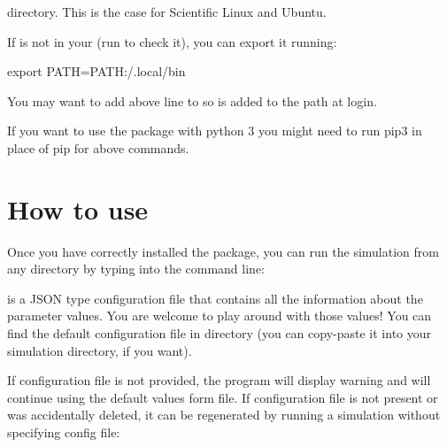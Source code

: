 \documentclass[letterpaper,10pt,english]{sphinxmanual}
\begin{document}
directory. This is the case for Scientific Linux and Ubuntu.

If  is not in your  (run  to check it), you can export it running:

\begin{sphinxVerbatim}[commandchars=\\\{\}]
export PATH=\PYGZdl{}PATH:\PYGZti{}/.local/bin
\end{sphinxVerbatim}

You may want to add above line to  so  is added to the path at login.

If you want to use the package with python 3 you might need to run pip3 in place of pip for above commands.


\chapter{How to use}
\label{\detokenize{index:how-to-use}}
Once you have correctly installed the package, you can run the simulation from any directory by typing into the command line:

\begin{sphinxVerbatim}[commandchars=\\\{\}]
  \PYG{p}{[}\PYG{p}{]}
\end{sphinxVerbatim}

 is a JSON type configuration file that contains all the information about the parameter values. You are welcome to play around with those values! You can find the default configuration file  in   directory (you can copy-paste it into your simulation directory, if you want).

If configuration file is not provided, the program will display warning and will continue using the default values form  file. If configuration file is not present or was accidentally deleted, it can be regenerated by running a simulation without specifying config file:

\begin{sphinxVerbatim}[commandchars=\\\{\}]
 
\end{sphinxVerbatim}
\end{document}
